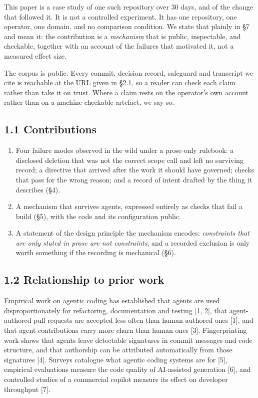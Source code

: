 \documentclass[11pt,a4paper]{article}
\begin{document}
This paper is a case study of one such repository over 30 days, and of the change that followed it. It is not a controlled experiment. It has one repository, one operator, one domain, and no comparison condition. We state that plainly in \S{}7 and mean it: the contribution is a \emph{mechanism} that is public, inspectable, and checkable, together with an account of the failures that motivated it, not a measured effect size.

The corpus is public. Every commit, decision record, safeguard and transcript we cite is reachable at the URL given in \S{}2.1, so a reader can check each claim rather than take it on trust. Where a claim rests on the operator's own account rather than on a machine-checkable artefact, we say so.

\subsection*{1.1 Contributions}

\begin{enumerate}
\item Four failure modes observed in the wild under a prose-only rulebook: a disclosed deletion that was not the correct scope call and left no surviving record; a directive that arrived after the work it should have governed; checks that pass for the wrong reason; and a record of intent drafted by the thing it describes (\S{}4).
\item A mechanism that survives agents, expressed entirely as checks that fail a build (\S{}5), with the code and its configuration public.
\item A statement of the design principle the mechanism encodes: \emph{constraints that are only stated in prose are not constraints}, and a recorded exclusion is only worth something if the recording is mechanical (\S{}6).
\end{enumerate}

\subsection*{1.2 Relationship to prior work}

Empirical work on agentic coding has established that agents are used disproportionately for refactoring, documentation and testing [1, 2], that agent-authored pull requests are accepted less often than human-authored ones [1], and that agent contributions carry more churn than human ones [3]. Fingerprinting work shows that agents leave detectable signatures in commit messages and code structure, and that authorship can be attributed automatically from those signatures [4]. Surveys catalogue what agentic coding systems are for [5], empirical evaluations measure the code quality of AI-assisted generation [6], and controlled studies of a commercial copilot measure its effect on developer throughput [7].
\end{document}
